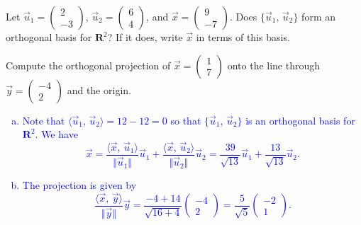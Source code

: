 \documentclass[a4paper,11pt]{article}
\newcommand{\R}{\mathbf{R}}
\newcommand{\blue}[1]{\textcolor{blue}{#1}}
\begin{document}
\begin{enumerate*}[(a)]
\item Let $\vec u_1=\left( \begin{smallmatrix}2\\-3\end{smallmatrix} \right)$,
  $\vec u_2=\left( \begin{smallmatrix}6\\4\end{smallmatrix} \right)$, and $\vec
  x=\left( \begin{smallmatrix}9\\-7\end{smallmatrix} \right)$. Does $\{\vec
  u_1,\,\vec u_2\}$ form an orthogonal basis for $\R^2$? If it does, write $\vec
  x$ in terms of this basis.
\item Compute the orthogonal projection of
  $\vec x=\left( \begin{smallmatrix}1\\7\end{smallmatrix} \right)$ onto the line
  through $\vec y = \left( \begin{smallmatrix}-4\\2\end{smallmatrix} \right)$
  and the origin. \\
\end{enumerate*}

\blue{
  \begin{enumerate}[(a)]
  \item Note that $\langle \vec u_1,\,\vec u_2 \rangle = 12-12 = 0$ so that
    $\{\vec u_1,\,\vec u_2\}$ is an orthogonal basis for $\R^2$. We have
    \[
      \vec x = \frac{\langle \vec x,\,\vec u_1 \rangle}{\Vert \vec u_1
        \Vert}\vec u_1 + \frac{\langle \vec x,\,\vec u_2 \rangle}{\Vert \vec u_2
        \Vert}\vec u_2 = \frac{39}{\sqrt{13}}\vec u_1 + \frac{13}{\sqrt{13}}\vec
      u_2.
    \]
  \item The projection is given by
    \[
      \frac{\langle \vec x,\,\vec y \rangle}{\Vert \vec y \Vert}\vec y
      = \frac{-4+14}{\sqrt{16+4}}
      \left(
        \begin{array}{r}
          -4\\2
        \end{array}
      \right)
      =\frac{5}{\sqrt{5}}
      \left(
        \begin{array}{r}
          -2\\1
        \end{array}
      \right).
    \] \\
  \end{enumerate}
}
\end{document}
